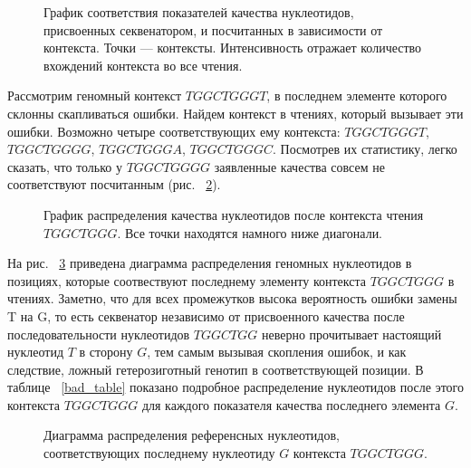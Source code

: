 	\begin{figure}[H]
	\caption{График соответствия показателей качества нуклеотидов, присвоенных секвенатором, и посчитанных в зависимости от контекста. Точки --- контексты. Интенсивность отражает количество вхождений контекста во все чтения.}
	\label{phred_graph}
	\end{figure}

Рассмотрим геномный контекст $TGGCTGGGT$, в последнем элементе которого склонны скапливаться ошибки. Найдем контекст в чтениях, который вызывает эти ошибки. Возможно четыре соответствующих ему контекста: $TGGCTGGGT$, $TGGCTGGGG$, $TGGCTGGGA$, $TGGCTGGGC$. Посмотрев их статистику, легко сказать, что только у $TGGCTGGGG$ заявленные качества совсем не соответствуют посчитанным (рис. ~\ref{bad_plot}).

	\begin{figure}[h!]
	\caption{График распределения качества нуклеотидов после контекста чтения $TGGCTGGG$. Все точки находятся намного ниже диагонали.}
	\label{bad_plot}
	\end{figure}

На рис. ~\ref{diag} приведена диаграмма распределения геномных нуклеотидов в позициях, которые соотвествуют последнему элементу контекста  $TGGCTGGG$ в чтениях. Заметно, что для всех промежутков высока вероятность ошибки замены T на G, то есть секвенатор независимо от присвоенного качества после последовательности нуклеотидов $TGGCTGG$ неверно прочитывает настоящий нуклеотид $T$ в сторону $G$, тем самым вызывая скопления ошибок, и как следствие, ложный гетерозиготный генотип в соответствующей позиции. В таблице ~\ref{bad_table} показано подробное распределение нуклеотидов после этого контекста $TGGCTGGG$ для каждого показателя качества последнего элемента $G$.

	\begin{figure}[h!]
	\caption{Диаграмма распределения референсных нуклеотидов, соответствующих последнему нуклеотиду $G$ контекста $TGGCTGGG$.}
	\label{diag}
	\end{figure}

